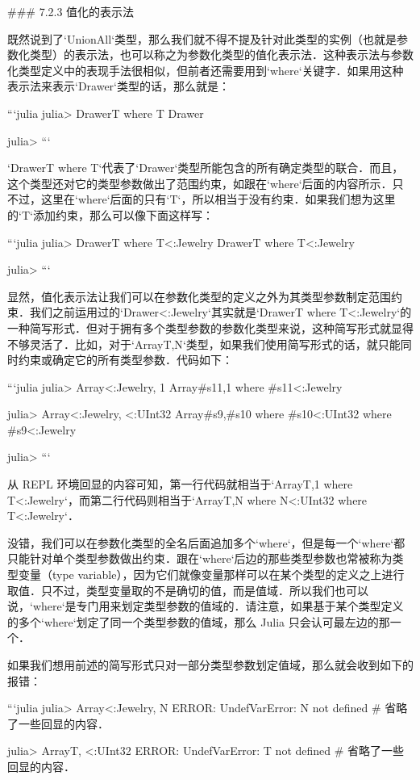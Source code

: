 ### 7.2.3 值化的表示法

既然说到了`UnionAll`类型，那么我们就不得不提及针对此类型的实例（也就是参数化类型）的表示法，也可以称之为参数化类型的值化表示法．这种表示法与参数化类型定义中的表现手法很相似，但前者还需要用到`where`关键字．如果用这种表示法来表示`Drawer`类型的话，那么就是：

```julia
julia> Drawer{T} where T
Drawer

julia> 
```

`Drawer{T} where T`代表了`Drawer`类型所能包含的所有确定类型的联合．而且，这个类型还对它的类型参数做出了范围约束，如跟在`where`后面的内容所示．只不过，这里在`where`后面的只有`T`，所以相当于没有约束．如果我们想为这里的`T`添加约束，那么可以像下面这样写：

```julia
julia> Drawer{T} where T<:Jewelry
Drawer{T} where T<:Jewelry

julia> 
```

显然，值化表示法让我们可以在参数化类型的定义之外为其类型参数制定范围约束．我们之前运用过的`Drawer{<:Jewelry}`其实就是`Drawer{T} where T<:Jewelry`的一种简写形式．但对于拥有多个类型参数的参数化类型来说，这种简写形式就显得不够灵活了．比如，对于`Array{T,N}`类型，如果我们使用简写形式的话，就只能同时约束或确定它的所有类型参数．代码如下：

```julia
julia> Array{<:Jewelry, 1}
Array{#s11,1} where #s11<:Jewelry

julia> Array{<:Jewelry, <:UInt32}
Array{#s9,#s10} where #s10<:UInt32 where #s9<:Jewelry

julia> 
```

从 REPL 环境回显的内容可知，第一行代码就相当于`Array{T,1} where T<:Jewelry`，而第二行代码则相当于`Array{T,N} where N<:UInt32 where T<:Jewelry`．

没错，我们可以在参数化类型的全名后面追加多个`where`，但是每一个`where`都只能针对单个类型参数做出约束．跟在`where`后边的那些类型参数也常被称为类型变量（type variable），因为它们就像变量那样可以在某个类型的定义之上进行取值．只不过，类型变量取的不是确切的值，而是值域．所以我们也可以说，`where`是专门用来划定类型参数的值域的．请注意，如果基于某个类型定义的多个`where`划定了同一个类型参数的值域，那么 Julia 只会认可最左边的那一个．

如果我们想用前述的简写形式只对一部分类型参数划定值域，那么就会收到如下的报错：

```julia
julia> Array{<:Jewelry, N}
ERROR: UndefVarError: N not defined
# 省略了一些回显的内容．

julia> Array{T, <:UInt32}
ERROR: UndefVarError: T not defined
# 省略了一些回显的内容．


